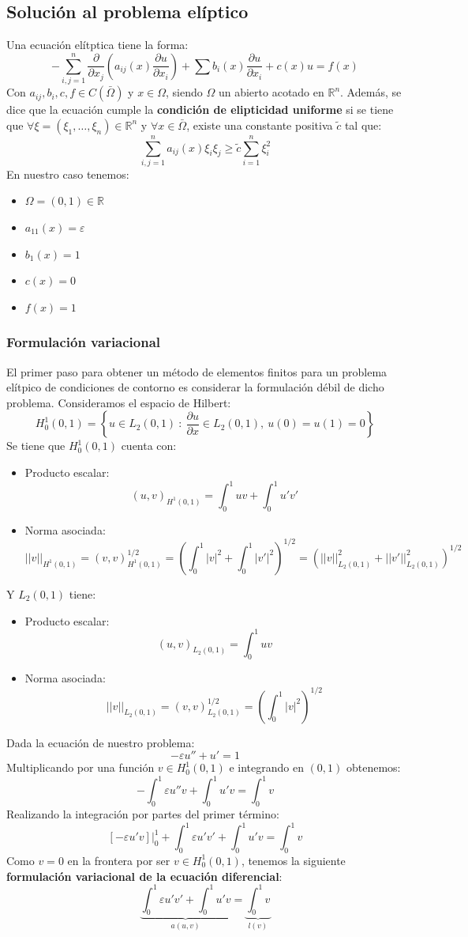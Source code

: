 \documentclass[spanish]{mathnotes}
\begin{document}
	\subsection{Solución al problema elíptico}
	Una ecuación elítptica tiene la forma:
	$$-\sum_{i,j=1}^n \frac{\partial}{\partial x_j}\left(a_{ij}(x) \frac{\partial u}{\partial x_i}\right) + 
	\sum b_i(x) \frac{\partial u}{\partial x_i} + c(x)u = f(x)$$
	Con $a_{ij}, b_i, c, f\in C(\bar{\Omega})$ y $x\in \Omega$, siendo $\Omega$ un abierto acotado en $\mathbb{R}^n$. Además, se dice que la ecuación cumple la \textbf{condición de elipticidad uniforme} si se tiene que $\forall \xi=(\xi_1, \hdots, \xi_n)\in \mathbb{R}^n$ y $\forall x\in\bar\Omega$, existe una constante positiva $\tilde{c}$ tal que:
	$$\sum_{i,j=1}^n a_{ij}(x) \xi_i\xi_j \ge \tilde{c} \sum_{i=1}^n \xi_i^2$$
	En nuestro caso tenemos:
	\begin{itemize}
		\item $\Omega = (0,1) \in \mathbb{R}$
		\item $a_{11}(x) = \varepsilon$
		\item $b_1(x) = 1$
		\item $c(x) = 0 $
		\item $f(x) = 1$
	\end{itemize}
	\subsubsection{Formulación variacional}
	El primer paso para obtener un método de elementos finitos para un problema elítpico de condiciones de contorno es considerar la formulación débil de dicho problema.
	Consideramos el espacio de Hilbert:
	$$H_0^1(0,1) = \left\{u\in L_2(0,1)\ :\ \frac{\partial u}{\partial x}\in L_2(0,1),\ u(0) = u(1) = 0\right\}$$
	\newpage
	\noindent Se tiene que $H_0^1(0,1)$ cuenta con:
	\begin{itemize}
		\item Producto escalar: $$(u,v)_{H^1(0,1)} = \int_0^1 uv + \int_0^1 u'v'$$
		\item Norma asociada: 
		$$||v||_{H^1(0,1)} = 
		(v, v)^{1/2}_{H^1(0,1)} =
		\left(\int_0^1 |v|^2 + \int_0^1 |v'|^2\right)^{1/2} =
		\left(||v||_{L_2(0,1)}^2+||v'||_{L_2(0,1)}^2\right)^{1/2}$$
	\end{itemize}	
	Y $L_2(0,1)$ tiene:
	\begin{itemize}
		\item Producto escalar:	$$(u,v)_{L_2(0,1)} = \int_0^1 uv$$
		\item Norma asociada: $$||v||_{L_2(0,1)} = (v,v)_{L_2(0,1)}^{1/2}  = \left(\int_0^1|v|^2\right)^{1/2}$$
	\end{itemize}
	Dada la ecuación de nuestro problema:
	$$-\varepsilon u'' + u' = 1$$
	Multiplicando por una función $v\in H_0^1(0,1)$ e integrando en $(0,1)$ obtenemos:
	$$-\int_0^1\varepsilon u'' v + \int_0^1 u'v = \int_0^1 v $$
	Realizando la integración por partes del primer término:
	$$\left.\left[-\varepsilon u'v\right]\right|_0^1+\int_0^1\varepsilon u'v' + \int_0^1u'v=\int_0^1 v$$
	Como $v=0$ en la frontera por ser $v\in H_0^1(0,1)$, tenemos la siguiente \textbf{formulación variacional de la ecuación diferencial}:
	$$\underbrace{\int_0^1\varepsilon u'v' + \int_0^1u'v}_{a(u,v)} =\underbrace{ \int_0^1 v}_{l(v)}$$
	
\end{document}
